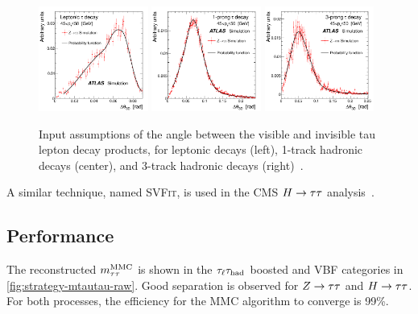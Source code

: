 \begin{figure}[tp]
  \centering
  \includegraphics[width=0.32\textwidth]{figures/ATLAS-CONF-2011-132/fig_01a}
  \includegraphics[width=0.32\textwidth]{figures/ATLAS-CONF-2011-132/fig_01b}
  \includegraphics[width=0.32\textwidth]{figures/ATLAS-CONF-2011-132/fig_01c}
  \caption{Input assumptions of the angle between the visible and invisible tau lepton decay products, for leptonic decays (left), 1-track hadronic decays (center), and 3-track hadronic decays (right)~\cite{ATLAS-CONF-2011-132}.}
  \label{fig:strategy-mtautau-inputs}
\end{figure}

A similar technique, named \textsc{SVFit}, is used in the CMS $H\rightarrow\tau\tau$ analysis~\cite{2014.cms-htautau}.

\subsection{Performance}
\label{sec:strategy-mtautau-performance}

The reconstructed $m_{\tau\tau}^\text{MMC}$ is shown in the $\tau_\ell\tau_\text{had}$ boosted and VBF categories in \cref{fig:strategy-mtautau-raw}. Good separation is observed for $Z\rightarrow\tau\tau$ and $H\rightarrow\tau\tau$. For both processes, the efficiency for the MMC algorithm to converge is 99\%.

